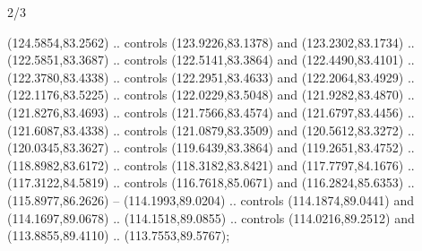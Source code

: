 \begin{flagdescription}{2/3}
\begin{scope}[shift={(0.5\flaglength,0.5)},scale=\flagwidth/320]
\begin{scope}[y=0.8pt, x=0.8pt, yscale=-1,shift={(-118.3,-146)}]
  (124.5854,83.2562) .. controls (123.9226,83.1378) and (123.2302,83.1734) ..
  (122.5851,83.3687) .. controls (122.5141,83.3864) and (122.4490,83.4101) ..
  (122.3780,83.4338) .. controls (122.2951,83.4633) and (122.2064,83.4929) ..
  (122.1176,83.5225) .. controls (122.0229,83.5048) and (121.9282,83.4870) ..
  (121.8276,83.4693) .. controls (121.7566,83.4574) and (121.6797,83.4456) ..
  (121.6087,83.4338) .. controls (121.0879,83.3509) and (120.5612,83.3272) ..
  (120.0345,83.3627) .. controls (119.6439,83.3864) and (119.2651,83.4752) ..
  (118.8982,83.6172) .. controls (118.3182,83.8421) and (117.7797,84.1676) ..
  (117.3122,84.5819) .. controls (116.7618,85.0671) and (116.2824,85.6353) ..
  (115.8977,86.2626) -- (114.1993,89.0204) .. controls (114.1874,89.0441) and
  (114.1697,89.0678) .. (114.1518,89.0855) .. controls (114.0216,89.2512) and
  (113.8855,89.4110) .. (113.7553,89.5767);


\end{scope}
\end{scope}
\end{flagdescription}
